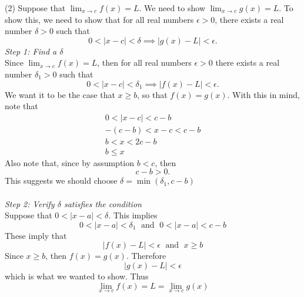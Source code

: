 \documentclass{article}
\begin{document}
	(2) Suppose that $\lim_{x \to c}{f(x)} = L$. We need to show $\lim_{x \to c}{g(x)} = L$. To show this, we need to show that for all real numbers $\epsilon > 0$, there exists a real number $\delta > 0$ such that
	$$0 < |x - c| < \delta \implies |g(x) - L| < \epsilon.$$
	\textit{Step 1: Find a $\delta$} \\
	Since $\lim_{x \to c}{f(x)} = L$, then for all real numbers $\epsilon > 0$ there exists a real number $\delta_1 > 0$ such that
	$$0 < |x - c| < \delta_1 \implies |f(x) - L| < \epsilon.$$
	We want it to be the case that $x \geq b$, so that $f(x) = g(x)$. With this in mind, note that
	\begin{align*}
		0 < |x - c| < c - b \\
		-(c - b) < x - c < c - b \tag{Abs. Val Ineq. 2}\\
		b < x < 2c -b \\
		b \leq x
	\end{align*}
	Also note that, since by assumption $b < c$, then
	$$c - b > 0.$$
	This suggests we should choose $\delta = \min{(\delta_1, c - b)}$ \\\\
	\textit{Step 2: Verify $\delta$ satisfies the condition} \\
	Suppose that $0 < |x - a| < \delta$. This implies
	$$0 < |x - a| < \delta_1 \; \text{ and } \; 0 < |x - a| < c - b$$
	These imply that
	$$|f(x) - L| < \epsilon \; \text{ and } \; x \geq b$$
	Since $x \geq b$, then $f(x) = g(x)$. Therefore
	$$|g(x) - L| < \epsilon$$
	which is what we wanted to show. Thus
	$$\lim_{x \to c}{f(x)} = L = \lim_{x \to c}{g(x)}$$
\end{document}
